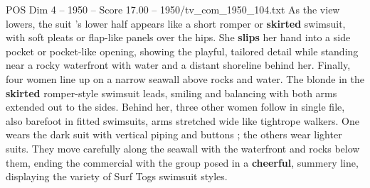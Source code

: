 \begin{textsample}{POS Dim 4 – 1950 – Score 17.00 – 1950/tv\_com\_1950\_104.txt}
As the view lowers, the suit ’s lower half appears like a short romper or \textbf{skirted} swimsuit, with soft pleats or flap-like panels over the hips.
She \textbf{slips} her hand into a side pocket or pocket-like opening, showing the playful, tailored detail while standing near a rocky waterfront with water and a distant shoreline behind her.
Finally, four women line up on a narrow seawall above rocks and water.
The blonde in the \textbf{skirted} romper-style swimsuit leads, smiling and balancing with both arms extended out to the sides.
Behind her, three other women follow in single file, also barefoot in fitted swimsuits, arms stretched wide like tightrope walkers.
One wears the dark suit with vertical piping and buttons ; the others wear lighter suits.
They move carefully along the seawall with the waterfront and rocks below them, ending the commercial with the group posed in a \textbf{cheerful}, summery line, displaying the variety of Surf Togs swimsuit styles.

\end{textsample}
